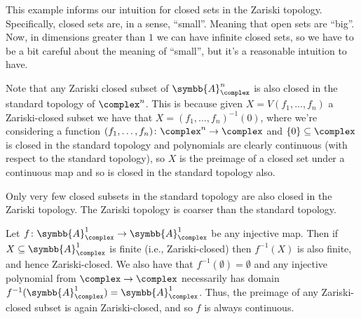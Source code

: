 \documentclass[fleqn]{NotesClass}
\newcommand{\affine}{\symbb{A}}
\begin{document}
    This example informs our intuition for closed sets in the Zariski topology.
    Specifically, closed sets are, in a sense, \enquote{small}.
    Meaning that open sets are \enquote{big}.
    Now, in dimensions greater than \(1\) we can have infinite closed sets, so we have to be a bit careful about the meaning of \enquote{small}, but it's a reasonable intuition to have.
    
    Note that any Zariski closed subset of \(\affine_{\complex}^n\) is also closed in the standard topology of \(\complex^n\).
    This is because given \(X = V(f_1, \dotsc, f_n)\) a Zariski-closed subset we have that \(X = (f_1, \dotsc, f_n)^{-1}(0)\), where we're considering a function \((f_1, \dotsc, f_n) \colon \complex^n \to \complex\) and \(\{0\} \subseteq \complex\) is closed in the standard topology and polynomials are clearly continuous (with respect to the standard topology), so \(X\) is the preimage of a closed set under a continuous map and so is closed in the standard topology also.
    
    Only very few closed subsets in the standard topology are also closed in the Zariski topology.
    The Zariski topology is coarser than the standard topology.
    
    \begin{exm}{}{}
        Let \(f \colon \affine_{\complex}^1 \to \affine_{\complex}^1\) be any injective map.
        Then if \(X \subseteq \affine_{\complex}^1\) is finite (i.e., Zariski-closed) then \(f^{-1}(X)\) is also finite, and hence Zariski-closed.
        We also have that \(f^{-1}(\emptyset) = \emptyset\) and any injective polynomial from \(\complex \to \complex\) necessarily has domain \(f^{-1}(\affine_{\complex}^1) = \affine_{\complex}^1\).
        Thus, the preimage of any Zariski-closed subset is again Zariski-closed, and so \(f\) is always continuous.
    \end{exm}
    
\end{document}
